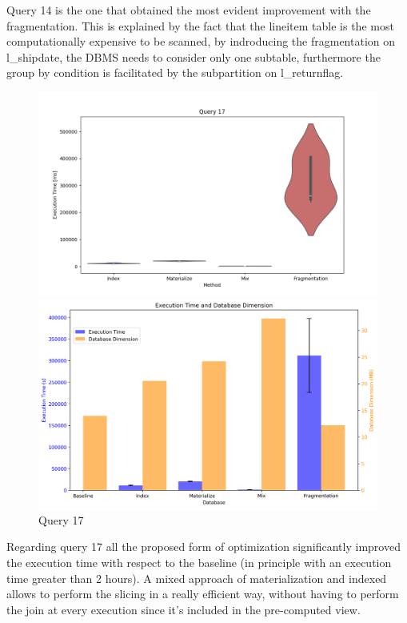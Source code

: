 Query 14 is the one that obtained the most evident improvement with the fragmentation. This is explained by the fact that the lineitem table is the most computationally expensive to be scanned, by indroducing the fragmentation on l\_shipdate, the DBMS needs to consider only one subtable, furthermore the group by condition is facilitated by the subpartition on l\_returnflag.
\begin{figure}[h!] 
\centering 
\begin{minipage}{0.5\textwidth} 
\centering \includegraphics[width=\linewidth]{images/query17.png}  
\end{minipage}
\begin{minipage}{0.45\textwidth} 
\centering 
\includegraphics[width=\linewidth]{images/double_barplot_q17.png} 
\end{minipage} 
\caption{Query 17} 
\end{figure}

Regarding query 17 all the proposed form of optimization significantly improved the execution time with respect to the baseline (in principle with an execution time greater than 2 hours). A mixed approach of materialization and indexed allows to perform the slicing in a really efficient way, without having to perform the join at every execution since it's included in the pre-computed view.  

